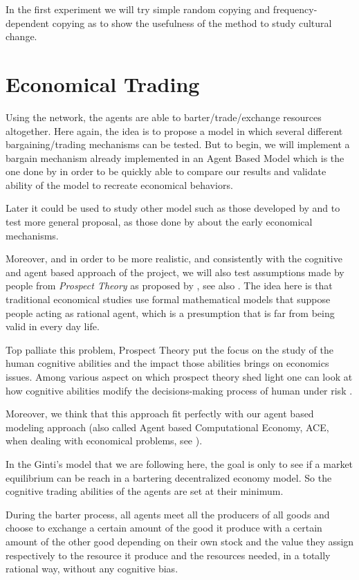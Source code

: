 \documentclass{wscpaperproc}
\begin{document}
In the first experiment we will try simple random copying and frequency-dependent copying as \cite{mesoudi_random_2009} to show the usefulness of the method to study cultural change. 


\section{Economical Trading}
\label{trade}

Using the network, the agents are able to barter/trade/exchange resources altogether. Here again, the idea is to propose a model in which several different bargaining/trading mechanisms can be tested. But to begin, we will implement a bargain mechanism already implemented in an Agent Based Model which is the one done by
\cite{gintis_emergence_2006} in order to be quickly able to compare our results and validate ability of the model to recreate economical behaviors. 

Later it could be used to study other model such as those developed by 
\cite{rubinstein_equilibrium_1985} and to test more general proposal, as those done by \cite{polanyi_trade_1957,
polanyi_livelihood_1977} about the early economical mechanisms.

Moreover, and in order to be more realistic, and consistently with the cognitive and agent based approach of the project, we will also test assumptions made by people from \emph{Prospect Theory} as proposed by 
\cite{kahneman_prospect_1979}, see also
\cite{camerer_prospect_2004}. The idea here is that traditional economical studies use formal mathematical models that suppose people acting as rational agent, which is a presumption that is far from being valid  in every day life. 

Top palliate this problem, Prospect Theory put the focus on the study of the human cognitive abilities and the impact those abilities brings on economics issues. Among various aspect on which prospect theory shed light one can look at how cognitive abilities modify the decisions-making process of human under risk
\cite{weber_disposition_1998}.

Moreover, we think that this approach fit perfectly with our agent based modeling approach (also called Agent based Computational Economy, ACE, when dealing with economical problems, see
\cite{tesfatsion_introduction_2001}).

In the Ginti's model that we are following here, the goal is only to see if a market equilibrium can be reach in a bartering decentralized economy model. So the cognitive trading abilities of the agents are set at their minimum. 

During the barter process, all agents meet all the producers of all goods and choose to exchange a certain amount of the good it produce with a certain amount of the other good depending on their own stock and the value they assign respectively to the resource it produce and the resources needed, in a totally rational way, without any cognitive bias.


  
\end{document}
